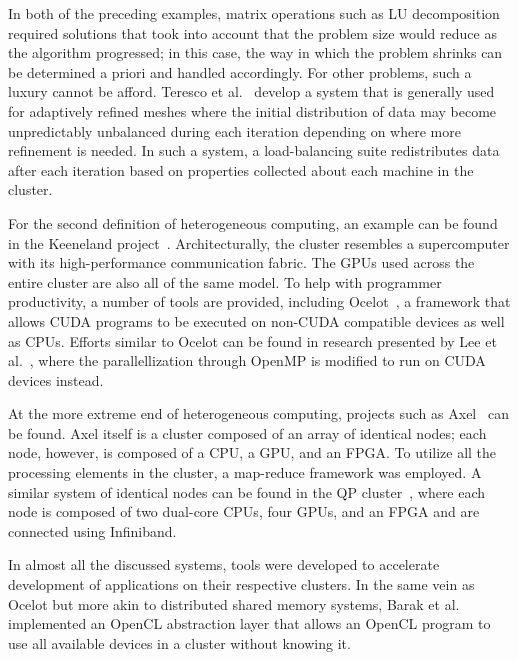 In both of the preceding examples, matrix operations such as LU
decomposition required solutions that took into account that the problem
size would reduce as the algorithm progressed; in this case, the way
in which the problem shrinks can be determined a priori and handled
accordingly. For other problems, such a luxury cannot be afford. Teresco
et al.~\cite{resource_aware} develop a system that is generally used
for adaptively refined meshes where the initial distribution of data
may become unpredictably unbalanced during each iteration depending on
where more refinement is needed. In such a system, a load-balancing suite
redistributes data after each iteration based on properties collected
about each machine in the cluster.

For the second definition of heterogeneous computing, an example can be
found in the Keeneland project~\cite{keeneland}. Architecturally, the
cluster resembles a supercomputer with its high-performance communication
fabric. The GPUs used across the entire cluster are also all of the
same model. To help with programmer productivity, a number of tools are
provided, including Ocelot~\cite{ocelot}, a framework that allows CUDA
programs to be executed on non-CUDA compatible devices as well as CPUs.
Efforts similar to Ocelot can be found in research presented by Lee
et al.~\cite{mp_to_gpu}, where the parallellization through OpenMP is
modified to run on CUDA devices instead.

At the more extreme end of heterogeneous computing, projects such as Axel~\cite{axel}
can be found. Axel itself is a cluster composed of an array of identical
nodes; each node, however, is composed of a CPU, a GPU, and an FPGA. To utilize
all the processing elements in the cluster, a map-reduce framework was
employed. A similar system of identical nodes can be found in the QP cluster~\cite{qp},
where each node is composed of two dual-core CPUs, four GPUs, and an FPGA and
are connected using Infiniband.

In almost all the discussed systems, tools were developed to accelerate
development of applications on their respective clusters. In the same
vein as Ocelot but more akin to distributed shared memory systems,
Barak et al.~\cite{cl_cluster} implemented an OpenCL abstraction layer
that allows an OpenCL program to use all available devices in a cluster
without knowing it.
